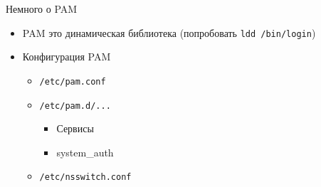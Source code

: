 \documentclass[ignorenonframetext, professionalfonts, hyperref={pdftex, unicode}]{beamer}
\begin{document}
\begin{frame}{Немного о PAM}
  \begin{itemize}
    \item PAM это динамическая библиотека (попробовать {\tt ldd /bin/login})
    \item Конфигурация PAM
      \begin{itemize}
        \item {\tt /etc/pam.conf}
        \item {\tt /etc/pam.d/...}
          \begin{itemize}
            \item Сервисы
            \item system\_auth
          \end{itemize}
        \item {\tt /etc/nsswitch.conf}
       \end{itemize}
    \end{itemize}
\end{frame}
\end{document}
